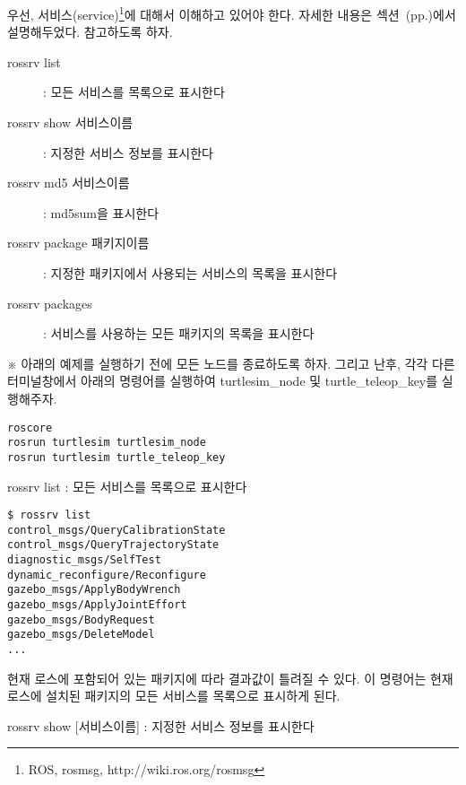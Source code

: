 우선, 서비스(service)\footnote{ROS, rosmsg, http://wiki.ros.org/rosmsg}에 대해서 이해하고 있어야 한다. 자세한 내용은 섹션~(pp.\pageref{def:RosService})에서 설명해두었다. 참고하도록 하자.

\vspace{\baselineskip}
\noindent
\begin{description}
\item[rossrv list] : 모든 서비스를 목록으로 표시한다
\item[rossrv show 서비스이름] : 지정한 서비스 정보를 표시한다
\item[rossrv md5 서비스이름] : md5sum을 표시한다
\item[rossrv package 패키지이름] : 지정한 패키지에서 사용되는 서비스의 목록을 표시한다
\item[rossrv packages] : 서비스를 사용하는 모든 패키지의 목록을 표시한다
\end{description}

\vspace{\baselineskip}
\noindent
※ 아래의 예제를 실행하기 전에 모든 노드를 종료하도록 하자. 그리고 난후, 각각 다른 터미널창에서 아래의 명령어를 실행하여 turtlesim\_node 및 turtle\_teleop\_key를 실행해주자.

\begin{lstlisting}[language=ROS]
roscore
rosrun turtlesim turtlesim_node 
rosrun turtlesim turtle_teleop_key
\end{lstlisting}

\setcounter{num}{0}

\vspace{\baselineskip}
\noindent
{}\circled{\thenum} rossrv list : 모든 서비스를 목록으로 표시한다

\begin{lstlisting}[language=ROS]
$ rossrv list
control_msgs/QueryCalibrationState
control_msgs/QueryTrajectoryState
diagnostic_msgs/SelfTest
dynamic_reconfigure/Reconfigure
gazebo_msgs/ApplyBodyWrench
gazebo_msgs/ApplyJointEffort
gazebo_msgs/BodyRequest
gazebo_msgs/DeleteModel
...
\end{lstlisting}

\noindent
현재 로스에 포함되어 있는 패키지에 따라 결과값이 틀려질 수 있다. 이 명령어는 현재 로스에 설치된 패키지의 모든 서비스를 목록으로 표시하게 된다.

\vspace{\baselineskip}
\noindent
{}\circled{\thenum} rossrv show [서비스이름] : 지정한 서비스 정보를 표시한다

